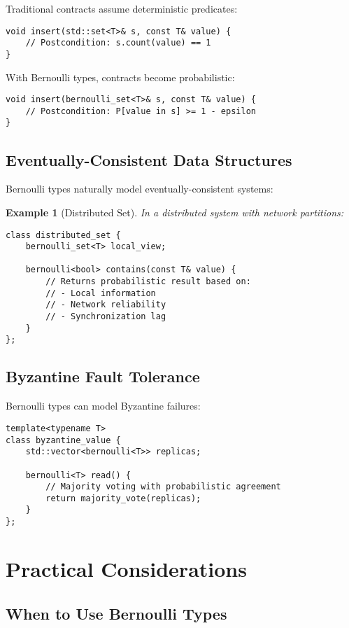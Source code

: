 \documentclass[11pt,final,hidelinks]{article}
\newtheorem{example}[theorem]{Example}
\begin{document}
Traditional contracts assume deterministic predicates:
\begin{verbatim}
void insert(std::set<T>& s, const T& value) {
    // Postcondition: s.count(value) == 1
}
\end{verbatim}

With Bernoulli types, contracts become probabilistic:
\begin{verbatim}
void insert(bernoulli_set<T>& s, const T& value) {
    // Postcondition: P[value in s] >= 1 - epsilon
}
\end{verbatim}

\subsection{Eventually-Consistent Data Structures}

Bernoulli types naturally model eventually-consistent systems:

\begin{example}[Distributed Set]
In a distributed system with network partitions:
\begin{verbatim}
class distributed_set {
    bernoulli_set<T> local_view;
    
    bernoulli<bool> contains(const T& value) {
        // Returns probabilistic result based on:
        // - Local information
        // - Network reliability
        // - Synchronization lag
    }
};
\end{verbatim}
\end{example}

\subsection{Byzantine Fault Tolerance}

Bernoulli types can model Byzantine failures:

\begin{verbatim}
template<typename T>
class byzantine_value {
    std::vector<bernoulli<T>> replicas;
    
    bernoulli<T> read() {
        // Majority voting with probabilistic agreement
        return majority_vote(replicas);
    }
};
\end{verbatim}

\section{Practical Considerations}

\subsection{When to Use Bernoulli Types}
\end{document}
